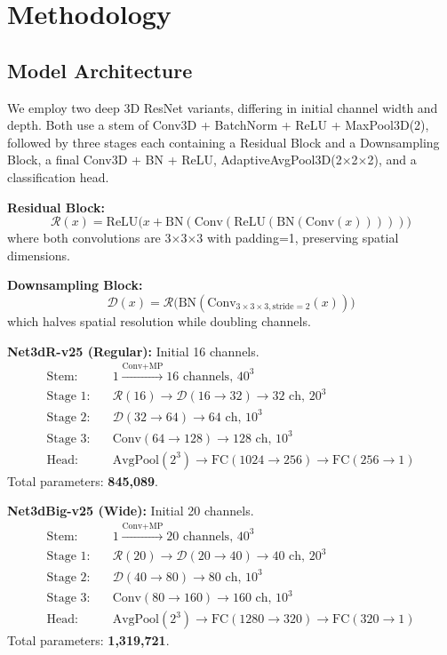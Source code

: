 \section{Methodology}
\label{sec:methodology}

\subsection{Model Architecture}
\label{sec:architecture}

We employ two deep 3D ResNet variants, differing in initial channel width and depth. Both use a stem of Conv3D + BatchNorm + ReLU + MaxPool3D(2), followed by three stages each containing a Residual Block and a Downsampling Block, a final Conv3D + BN + ReLU, AdaptiveAvgPool3D(2$\times$2$\times$2), and a classification head.

\noindent\textbf{Residual Block:}
\begin{equation}
    \mathcal{R}(x) = \text{ReLU}\big(x + \text{BN}(\text{Conv}(\text{ReLU}(\text{BN}(\text{Conv}(x)))))\big)
\end{equation}
where both convolutions are 3$\times$3$\times$3 with padding=1, preserving spatial dimensions.

\noindent\textbf{Downsampling Block:}
\begin{equation}
    \mathcal{D}(x) = \mathcal{R}\big(\text{BN}(\text{Conv}_{3\times3\times3,\text{stride}=2}(x))\big)
\end{equation}
which halves spatial resolution while doubling channels.

\noindent\textbf{Net3dR-v25 (Regular):} Initial 16 channels.
\begin{align*}
    \text{Stem:} & \quad 1 \xrightarrow{\text{Conv+MP}} 16 \text{ channels, } 40^3 \\
    \text{Stage 1:} & \quad \mathcal{R}(16) \to \mathcal{D}(16\!\to\!32) \to 32 \text{ ch, } 20^3 \\
    \text{Stage 2:} & \quad \mathcal{D}(32\!\to\!64) \to 64 \text{ ch, } 10^3 \\
    \text{Stage 3:} & \quad \text{Conv}(64\!\to\!128) \to 128 \text{ ch, } 10^3 \\
    \text{Head:} & \quad \text{AvgPool}(2^3) \to \text{FC}(1024\!\to\!256) \to \text{FC}(256\!\to\!1)
\end{align*}
Total parameters: \textbf{845,089}.

\noindent\textbf{Net3dBig-v25 (Wide):} Initial 20 channels.
\begin{align*}
    \text{Stem:} & \quad 1 \xrightarrow{\text{Conv+MP}} 20 \text{ channels, } 40^3 \\
    \text{Stage 1:} & \quad \mathcal{R}(20) \to \mathcal{D}(20\!\to\!40) \to 40 \text{ ch, } 20^3 \\
    \text{Stage 2:} & \quad \mathcal{D}(40\!\to\!80) \to 80 \text{ ch, } 10^3 \\
    \text{Stage 3:} & \quad \text{Conv}(80\!\to\!160) \to 160 \text{ ch, } 10^3 \\
    \text{Head:} & \quad \text{AvgPool}(2^3) \to \text{FC}(1280\!\to\!320) \to \text{FC}(320\!\to\!1)
\end{align*}
Total parameters: \textbf{1,319,721}.

